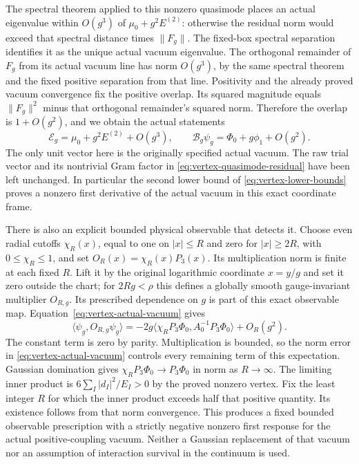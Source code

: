 The spectral theorem applied to this nonzero quasimode places an
actual eigenvalue within $O(g^3)$ of $\mu_0+g^2E^{(2)}$: otherwise
the residual norm would exceed that spectral distance times
$\|F_g\|$. The fixed-box spectral separation identifies it as the
unique actual vacuum eigenvalue. The orthogonal remainder of $F_g$
from its actual vacuum line has norm $O(g^3)$, by the same spectral
theorem and the fixed positive separation from that line. Positivity
and the already proved vacuum convergence fix the positive overlap.
Its squared magnitude equals $\|F_g\|^2$ minus that orthogonal
remainder's squared norm. Therefore the overlap is $1+O(g^2)$,
and we obtain the actual statements
\begin{equation}\label{eq:vertex-actual-vacuum}
 \mathcal E_g=\mu_0+g^2E^{(2)}+O(g^3),\qquad
 \mathcal B_g\psi_g=\Phi_0+g\phi_1+O(g^2).
\end{equation}
The only unit vector here is the originally specified actual vacuum.
The raw trial vector and its nontrivial Gram factor in
\eqref{eq:vertex-quasimode-residual} have been left unchanged.
In particular the second lower bound of
\eqref{eq:vertex-lower-bounds} proves a nonzero first derivative
of the actual vacuum in this exact coordinate frame.

There is also an explicit bounded physical observable that detects it.
Choose even radial cutoffs $\chi_R(x)$, equal to one on $|x|\le R$
and zero for $|x|\ge2R$, with $0\le\chi_R\le1$, and set
$O_R(x)=\chi_R(x)P_3(x)$. Its multiplication norm is finite at
each fixed $R$. Lift it by the original logarithmic coordinate
$x=y/g$ and set it zero outside the chart; for $2Rg<\rho$ this
defines a globally smooth gauge-invariant multiplier $O_{R,g}$.
Its prescribed dependence on $g$ is part of this exact observable
map. Equation~\eqref{eq:vertex-actual-vacuum} gives
\begin{equation}\label{eq:vertex-observable-response}
 \langle\psi_g,O_{R,g}\psi_g\rangle
   =-2g\langle\chi_RP_3\Phi_0,A_0^{-1}P_3\Phi_0\rangle+O_R(g^2).
\end{equation}
The constant term is zero by parity. Multiplication is bounded, so
the norm error in \eqref{eq:vertex-actual-vacuum} controls every
remaining term of this expectation. Gaussian domination gives
$\chi_RP_3\Phi_0\to P_3\Phi_0$ in norm as $R\to\infty$.
The limiting inner product is
$6\sum_I|d_I|^2/E_I>0$ by the proved nonzero vertex. Fix the least
integer $R$ for which the inner product exceeds half that positive
quantity. Its existence follows from that norm convergence. This
produces a fixed bounded observable prescription with a strictly
negative nonzero first response for the actual positive-coupling
vacuum. Neither a Gaussian replacement of that vacuum nor an
assumption of interaction survival in the continuum is used.

